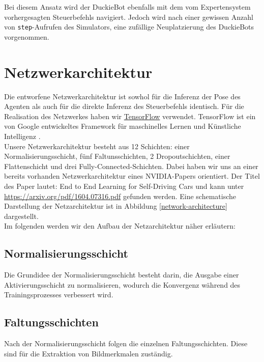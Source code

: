 Bei diesem Ansatz wird der DuckieBot ebenfalls mit dem vom Expertensystem vorhergesagten Steuerbefehls navigiert. Jedoch wird nach einer gewissen Anzahl von \texttt{step}-Aufrufen des Simulators, eine zufällige Neuplatzierung des DuckieBots vorgenommen.


\section{Netzwerkarchitektur}

Die entworfene Netzwerkarchitektur ist sowhol für die Inferenz der Pose des Agenten als auch für die direkte Inferenz des Steuerbefehls identisch.
Für die Realisation des Netzwerkes haben wir \href{https://www.tensorflow.org/}{TensorFlow} verwendet. TensorFlow ist ein von Google entwickeltes Framework für maschinelles Lernen und Künstliche Intelligenz \cite{bigdata}. \\

Unsere Netzwerkarchitektur besteht aus 12 Schichten: einer Normalisierungsschicht, fünf Faltunsschichten, 2 Dropoutschichten, einer Flattenschicht und drei Fully-Connected-Schichten.
Dabei haben wir uns an einer bereits vorhanden Netzwerkarchitektur eines NVIDIA-Papers orientiert. Der Titel des Paper lautet: \glqq End to End Learning for Self-Driving Cars\grqq{} und kann unter \href{https://arxiv.org/pdf/1604.07316.pdf}{https://arxiv.org/pdf/1604.07316.pdf} gefunden werden.
Eine schematische Darstellung der Netzarchitektur ist in Abbildung \ref{network-architecture} dargestellt. \\

Im folgenden werden wir den Aufbau der Netzarchitektur näher erläutern:

\subsection{Normalisierungsschicht}
Die Grundidee der Normalisierungsschicht besteht darin, die Ausgabe einer Aktivierungsschicht zu normalisieren, wodurch die Konvergenz während des Trainingsprozesses verbessert wird. \cite{tensorflow}

\subsection{Faltungsschichten}
Nach der Normalisierungsschicht folgen die einzelnen Faltungsschichten. Diese sind für die Extraktion von Bildmerkmalen zuständig. \\

